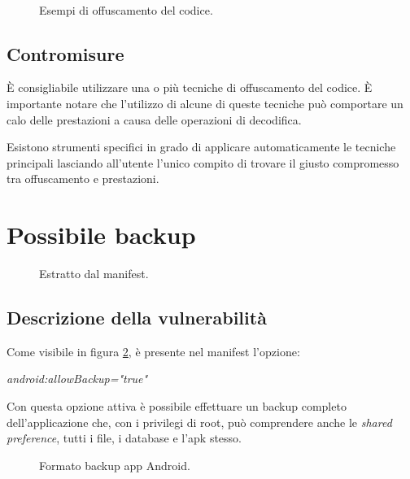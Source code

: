 \begin{figure}[h]
	\centering
	 \\
	\caption{Esempi di offuscamento del codice.}
	\label{fig:obfuscation}
\end{figure}

\subsection{Contromisure}
È consigliabile utilizzare una o più tecniche di offuscamento del codice. È importante notare che l'utilizzo di alcune di queste tecniche può comportare un calo delle prestazioni a causa delle operazioni di decodifica.

Esistono strumenti specifici in grado di applicare automaticamente le tecniche principali lasciando all'utente l'unico compito di trovare il giusto compromesso tra offuscamento e prestazioni.

\section{Possibile backup}

\begin{figure}[h]
	\centering 
	\caption{Estratto dal manifest.}
	\label{fig:backup}
\end{figure}

\subsection{Descrizione della vulnerabilità}

Come visibile in figura \ref{fig:backup}, è presente nel manifest l'opzione:
\begin{center}
	\emph{android:allowBackup="true"}
\end{center}

Con questa opzione attiva è possibile effettuare un backup completo dell'applicazione che, con i privilegi di root, può comprendere anche le \emph{shared preference}, tutti i file, i database e l'apk stesso.
\begin{figure}[h]
	\centering 
	\caption{Formato backup app Android.}
	\label{fig:structure}
\end{figure}


